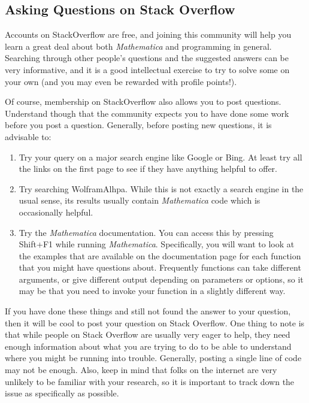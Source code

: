 \subsection{Asking Questions on Stack Overflow}
Accounts on StackOverflow are free, and joining this community will help you learn a great deal about both \emph{Mathematica} and programming in general. Searching through other people's questions and the suggested answers can be very informative, and it is a good intellectual exercise to try to solve some on your own (and you may even be rewarded with profile points!).

Of course, membership on StackOverflow also allows you to post questions. Understand though that the community expects you to have done some work before you post a question. Generally, before posting new questions, it is advisable to:

\begin{enumerate}
	   \item Try your query on a major search engine like Google or Bing. At least try all the links on the first page to see if they have anything helpful to offer.
	   \item Try searching WolframAlhpa. While this is not exactly a search engine in the usual sense, its results usually contain \emph{Mathematica} code which is occasionally helpful.
	   \item Try the \emph{Mathematica} documentation. You can access this by pressing Shift+F1 while running \emph{Mathematica}. Specifically, you will want to look at the examples that are available on the documentation page for each function that you might have questions about. Frequently functions can take different arguments, or give different output depending on parameters or options, so it may be that you need to invoke your function in a slightly different way. 
\end{enumerate}

If you have done these things and still not found the answer to your question, then it will be cool to post your question on Stack Overflow. One thing to note is that while people on Stack Overflow are usually very eager to help, they need enough information about what you are trying to do to be able to understand where you might be running into trouble. Generally, posting a single line of code may not be enough. Also, keep in mind that folks on the internet are very unlikely to be familiar with your research, so it is important to track down the issue as specifically as possible.

